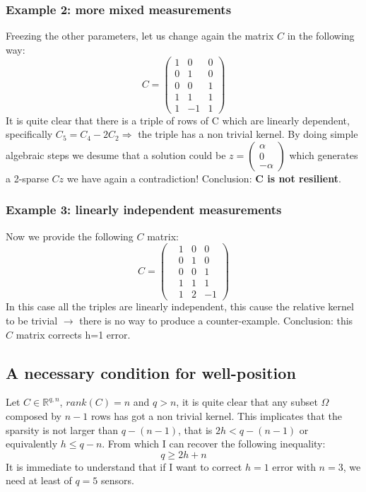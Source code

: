 {\color{orange}\subsubsection{Example 2: more mixed measurements}}
Freezing the other parameters, let us change again the matrix $C$ in the following way: 
$$C=\begin{pmatrix}
    1&0&0\\0&1&0\\0&0&1\\1&1&1\\1&-1&1
\end{pmatrix}$$
It is quite clear that there is a triple of rows of C which are linearly dependent, specifically $C_5=C_4-2C_2 \Rightarrow$ the triple has a non trivial kernel. By doing simple algebraic steps we desume that a solution could be  $z=\begin{pmatrix} 
    \alpha\\0\\-\alpha
\end{pmatrix}$ which generates a 2-sparse $Cz$ we have again a contradiction! Conclusion: \textbf{C is not resilient}. 

{\color{orange}\subsubsection{Example 3: linearly independent measurements}}
Now we provide the following $C$ matrix: 
$$C=\begin{pmatrix}
    &1&0&0\\&0&1&0\\&0&0&1\\&1&1&1\\&1&2&-1
\end{pmatrix}$$
In this case all the triples are linearly independent, this cause the relative kernel to be trivial $\rightarrow$ there is no way to produce a counter-example. 
Conclusion: this  $C$ matrix corrects h=1 error.

\subsection{A necessary condition for well-position}
Let $C\in \mathbb{R}^{q,n}$, $rank(C)=n$ and $q>n$, it is quite clear that any subset $\Omega$ composed by $n-1$ rows  has got a non trivial kernel. This implicates that the sparsity is not larger than $q-(n-1)$, that is $2h < q-(n-1)$ or equivalently $h \le q-n$. From which I can recover the following inequality: $$q\ge 2h+n$$
It is immediate to understand that if I want to correct $h=1$ error with $n=3$, we need at least of $q=5$ sensors.

